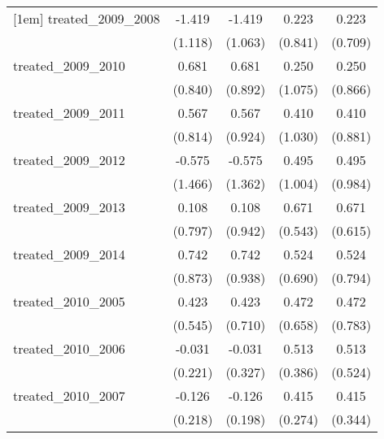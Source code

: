 {\begin{tabular}{l*{4}{c}}
[1em]
treated\_2009\_2008&      -1.419         &      -1.419         &       0.223         &       0.223         \\
            &     (1.118)         &     (1.063)         &     (0.841)         &     (0.709)         \\
[1em]
treated\_2009\_2010&       0.681         &       0.681         &       0.250         &       0.250         \\
            &     (0.840)         &     (0.892)         &     (1.075)         &     (0.866)         \\
[1em]
treated\_2009\_2011&       0.567         &       0.567         &       0.410         &       0.410         \\
            &     (0.814)         &     (0.924)         &     (1.030)         &     (0.881)         \\
[1em]
treated\_2009\_2012&      -0.575         &      -0.575         &       0.495         &       0.495         \\
            &     (1.466)         &     (1.362)         &     (1.004)         &     (0.984)         \\
[1em]
treated\_2009\_2013&       0.108         &       0.108         &       0.671         &       0.671         \\
            &     (0.797)         &     (0.942)         &     (0.543)         &     (0.615)         \\
[1em]
treated\_2009\_2014&       0.742         &       0.742         &       0.524         &       0.524         \\
            &     (0.873)         &     (0.938)         &     (0.690)         &     (0.794)         \\
[1em]
treated\_2010\_2005&       0.423         &       0.423         &       0.472         &       0.472         \\
            &     (0.545)         &     (0.710)         &     (0.658)         &     (0.783)         \\
[1em]
treated\_2010\_2006&      -0.031         &      -0.031         &       0.513         &       0.513         \\
            &     (0.221)         &     (0.327)         &     (0.386)         &     (0.524)         \\
[1em]
treated\_2010\_2007&      -0.126         &      -0.126         &       0.415         &       0.415         \\
            &     (0.218)         &     (0.198)         &     (0.274)         &     (0.344)         \\

\end{tabular}}
